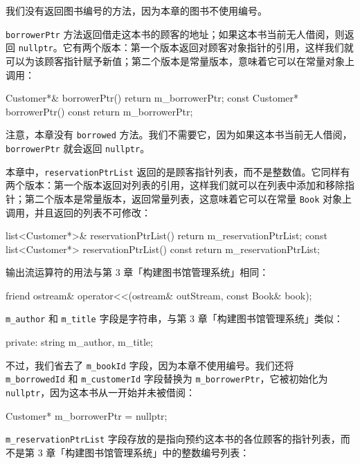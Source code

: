 我们没有返回图书编号的方法，因为本章的图书不使用编号。

\texttt{borrowerPtr} 方法返回借走这本书的顾客的地址；如果这本书当前无人借阅，则返回 \texttt{nullptr}。它有两个版本：第一个版本返回对顾客对象指针的引用，这样我们就可以为该顾客指针赋予新值；第二个版本是常量版本，意味着它可以在常量对象上调用：

\begin{codebox}
    Customer*& borrowerPtr() { return m_borrowerPtr; }
    const Customer* borrowerPtr() const { return m_borrowerPtr; }
\end{codebox}

注意，本章没有 \texttt{borrowed} 方法。我们不需要它，因为如果这本书当前无人借阅，\texttt{borrowerPtr} 就会返回 \texttt{nullptr}。

本章中，\texttt{reservationPtrList} 返回的是顾客指针列表，而不是整数值。它同样有两个版本：第一个版本返回对列表的引用，这样我们就可以在列表中添加和移除指针；第二个版本是常量版本，返回常量列表，这意味着它可以在常量 \texttt{Book} 对象上调用，并且返回的列表不可修改：

\begin{codebox}
    list<Customer*>& reservationPtrList()
        { return m_reservationPtrList; }
    const list<Customer*> reservationPtrList() const
        { return m_reservationPtrList; }
\end{codebox}

输出流运算符的用法与第 3 章「构建图书馆管理系统」相同：

\begin{codebox}
    friend ostream& operator<<(ostream& outStream,
        const Book& book);
\end{codebox}

\texttt{m\_author} 和 \texttt{m\_title} 字段是字符串，与第 3 章「构建图书馆管理系统」类似：

\begin{codebox}
  private:
    string m_author, m_title;
\end{codebox}

不过，我们省去了 \texttt{m\_bookId} 字段，因为本章不使用编号。我们还将 \texttt{m\_borrowedId} 和 \texttt{m\_customerId} 字段替换为 \texttt{m\_borrowerPtr}，它被初始化为 \texttt{nullptr}，因为这本书从一开始并未被借阅：

\begin{codebox}
    Customer* m_borrowerPtr = nullptr;
\end{codebox}

\texttt{m\_reservationPtrList} 字段存放的是指向预约这本书的各位顾客的指针列表，而不是第 3 章「构建图书馆管理系统」中的整数编号列表：

